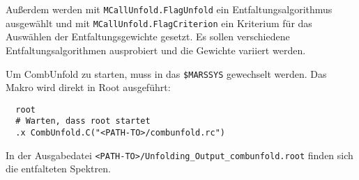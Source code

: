 Außerdem werden mit
\texttt{MCallUnfold.FlagUnfold}
ein Entfaltungsalgorithmus ausgewählt und mit
\texttt{MCallUnfold.FlagCriterion}
ein Kriterium für das Auswählen der Entfaltungsgewichte gesetzt.
Es sollen verschiedene Entfaltungsalgorithmen ausprobiert
und die Gewichte variiert werden.

Um CombUnfold zu starten, muss in das
\texttt{\$MARSSYS}
gewechselt werden.
Das Makro wird direkt in Root ausgeführt:
\begin{lstlisting}
  root
  # Warten, dass root startet
  .x CombUnfold.C("<PATH-TO>/combunfold.rc")
\end{lstlisting}

In der Ausgabedatei
\texttt{<PATH-TO>/Unfolding\_Output\_combunfold.root}
finden sich die entfalteten Spektren.
